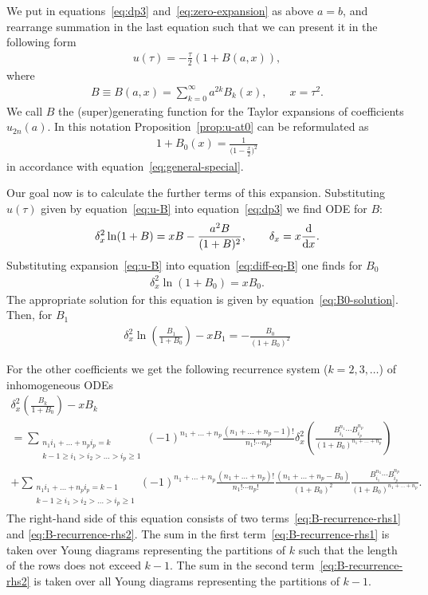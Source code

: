 \documentclass[pdftex]{sigma}
\numberwithin{equation}{section}
\begin{document}
We put in equations~\eqref{eq:dp3} and~\eqref{eq:zero-expansion} as above $a=b$, and rearrange summation in the last equation
such that we can present it in the following form
\begin{gather}\label{eq:u-B}
u(\tau)=-\frac\tau2(1+B(a,x)),
\end{gather}
where
\begin{gather*}%
B\equiv B(a,x)=\sum\limits_{k=0}^{\infty}a^{2k}B_k(x),\qquad x=\tau^2.
\end{gather*}
We call $B$ the (super)generating function for the Taylor expansions of coefficients $u_{2n}(a)$.
In this notation Proposition~\ref{prop:u-at0} can be reformulated as
\begin{gather}\label{eq:B0-solution}
1+B_0(x)=\frac1{\big(1-\frac{x}2\big)^2}
\end{gather}
in accordance with equation~\eqref{eq:general-special}.

Our goal now is to calculate the further terms of this expansion. Substituting $u(\tau)$ given by equation~\eqref{eq:u-B} into equation~\ref{eq:dp3} we find ODE for $B$:
\begin{gather}\label{eq:diff-eq-B}
\delta_x^2\ln(1+B)=xB-\frac{a^2B}{(1+B)^2},\qquad\delta_x=x\frac{{\rm d}}{{\rm d}x}.
\end{gather}
Substituting expansion~\eqref{eq:u-B} into equation~\eqref{eq:diff-eq-B} one finds for $B_0$
\begin{gather*}
\delta_x^2\ln(1+B_0)=xB_0.
\end{gather*}
The appropriate solution for this equation is given by equation~\eqref{eq:B0-solution}. Then, for $B_1$
\begin{gather}\label{eq:B1}
\delta_x^2\ln\left(\frac{B_1}{1+B_0}\right)-xB_1=-\frac{B_0}{(1+B_0)^2}
\end{gather}

For the other coefficients we get the following recurrence system ($k=2,3,\ldots$) of inhomogeneous ODEs
\begin{gather}
 \delta_x^2\left(\frac{B_k}{1+B_0}\right)-xB_k\label{eq:B-recurrence-homo}\\
= \sum_{\substack{n_1i_1+\dots+n_pi_p=k\\k-1\geq i_1>i_2>\dots>i_p\geq1}}
(-1)^{n_1+\dots+n_p} \frac{(n_1+\dots+n_p-1)!}{n_1!\cdots n_p!}
\delta_x^2\left(\frac{B_{i_1}^{n_1}\cdots B_{i_p}^{n_p}}{(1+B_0)^{n_1+\dots+n_p}}\right)
\label{eq:B-recurrence-rhs1}\\
+\!\!\!\sum_{\substack{n_1i_1+\dots+n_pi_p=k-1\\k-1\geq i_1>i_2>\dots>i_p\geq1}}\!\!\!\!\!
(-1)^{n_1+\dots+n_p} \frac{(n_1+\dots+n_p)!}{n_1!\cdots n_p!}
\frac{(n_1+\dots+n_p-B_0)}{(1+B_0)^2}\frac{B_{i_1}^{n_1}\cdots B_{i_p}^{n_p}}{(1+B_0)^{n_1+\dots+n_p}}.\!\!\!\!\label{eq:B-recurrence-rhs2}
\end{gather}
The right-hand side of this equation consists of two terms~\eqref{eq:B-recurrence-rhs1} and \eqref{eq:B-recurrence-rhs2}.
The sum in the first term~\eqref{eq:B-recurrence-rhs1} is taken over Young diagrams representing the partitions of $k$ such that
the length of the rows does not exceed $k-1$. The sum in the second term~\eqref{eq:B-recurrence-rhs2} is taken over all
Young diagrams representing the partitions of $k-1$.
\end{document}
